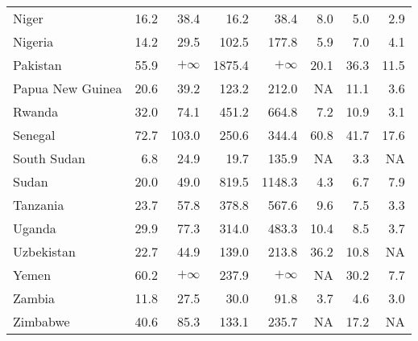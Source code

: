 \begin{table}[b]
\begin{tabular}[t]{lrrrrrrr}
Niger & 16.2 & 38.4 & 16.2 & 38.4 & 8.0 & 5.0 & 2.9\\
Nigeria & 14.2 & 29.5 & 102.5 & 177.8 & 5.9 & 7.0 & 4.1\\
Pakistan & 55.9 & $+\infty$ & 1875.4 & $+\infty$ & 20.1 & 36.3 & 11.5\\
Papua New Guinea & 20.6 & 39.2 & 123.2 & 212.0 & NA & 11.1 & 3.6\\
Rwanda & 32.0 & 74.1 & 451.2 & 664.8 & 7.2 & 10.9 & 3.1\\
Senegal & 72.7 & 103.0 & 250.6 & 344.4 & 60.8 & 41.7 & 17.6\\
South Sudan & 6.8 & 24.9 & 19.7 & 135.9 & NA & 3.3 & NA\\
Sudan & 20.0 & 49.0 & 819.5 & 1148.3 & 4.3 & 6.7 & 7.9\\
Tanzania & 23.7 & 57.8 & 378.8 & 567.6 & 9.6 & 7.5 & 3.3\\
Uganda & 29.9 & 77.3 & 314.0 & 483.3 & 10.4 & 8.5 & 3.7\\
Uzbekistan & 22.7 & 44.9 & 139.0 & 213.8 & 36.2 & 10.8 & NA\\
Yemen & 60.2 & $+\infty$ & 237.9 & $+\infty$ & NA & 30.2 & 7.7\\
Zambia & 11.8 & 27.5 & 30.0 & 91.8 & 3.7 & 4.6 & 3.0\\
Zimbabwe & 40.6 & 85.3 & 133.1 & 235.7 & NA & 17.2 & NA\\
\bottomrule
\end{tabular}
\end{table}